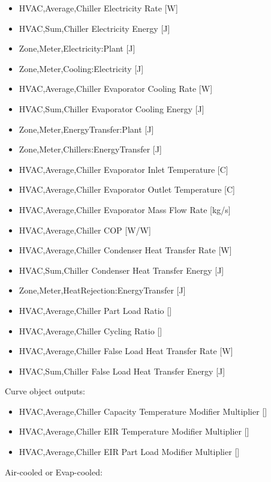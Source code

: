 \begin{itemize}
\item
  HVAC,Average,Chiller Electricity Rate {[}W{]}
\item
  HVAC,Sum,Chiller Electricity Energy {[}J{]}
\item
  Zone,Meter,Electricity:Plant {[}J{]}
\item
  Zone,Meter,Cooling:Electricity {[}J{]}
\item
  HVAC,Average,Chiller Evaporator Cooling Rate {[}W{]}
\item
  HVAC,Sum,Chiller Evaporator Cooling Energy {[}J{]}
\item
  Zone,Meter,EnergyTransfer:Plant {[}J{]}
\item
  Zone,Meter,Chillers:EnergyTransfer {[}J{]}
\item
  HVAC,Average,Chiller Evaporator Inlet Temperature {[}C{]}
\item
  HVAC,Average,Chiller Evaporator Outlet Temperature {[}C{]}
\item
  HVAC,Average,Chiller Evaporator Mass Flow Rate {[}kg/s{]}
\item
  HVAC,Average,Chiller COP {[}W/W{]}
\item
  HVAC,Average,Chiller Condenser Heat Transfer Rate {[}W{]}
\item
  HVAC,Sum,Chiller Condenser Heat Transfer Energy {[}J{]}
\item
  Zone,Meter,HeatRejection:EnergyTransfer {[}J{]}
\item
  HVAC,Average,Chiller Part Load Ratio {[]}
\item
  HVAC,Average,Chiller Cycling Ratio {[]}
\item
  HVAC,Average,Chiller False Load Heat Transfer Rate {[}W{]}
\item
  HVAC,Sum,Chiller False Load Heat Transfer Energy {[}J{]}
\end{itemize}

Curve object outputs:

\begin{itemize}
\item
  HVAC,Average,Chiller Capacity Temperature Modifier Multiplier {[]}
\item
  HVAC,Average,Chiller EIR Temperature Modifier Multiplier {[]}
\item
  HVAC,Average,Chiller EIR Part Load Modifier Multiplier {[]}
\end{itemize}

Air-cooled or Evap-cooled:

